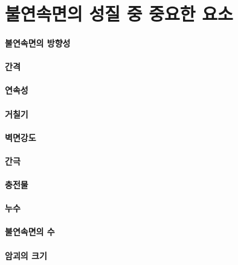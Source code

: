 \documentclass[12pt, a4paper, oneside]{book}
\begin{document}
	

	\clearpage
	\section{불연속면의 성질 중 중요한 요소}

		\paragraph{불연속면의 방향성}
		
		\paragraph{간격}
		\paragraph{연속성}
		\paragraph{거칠기}
		\paragraph{벽면강도}
		
		\paragraph{간극}
		
		\paragraph{충전물}
		
		\paragraph{누수}
		
		\paragraph{불연속면의 수}
		
		\paragraph{암괴의 크기}
		
		
	
	
	
	\clearpage
\end{document}

